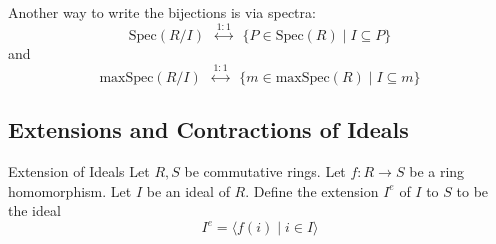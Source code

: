 \documentclass[a4paper]{article}
\begin{document}
Another way to write the bijections is via spectra: $$\text{Spec}(R/I)\;\;\overset{1:1}{\longleftrightarrow}\;\;\{P\in\text{Spec}(R)\;|\;I\subseteq P\}$$ and $$\text{maxSpec}(R/I)\;\;\overset{1:1}{\longleftrightarrow}\;\;\{m\in\text{maxSpec}(R)\;|\;I\subseteq m\}$$

\subsection{Extensions and Contractions of Ideals}
\begin{defn}{Extension of Ideals}{} Let $R,S$ be commutative rings. Let $f:R\to S$ be a ring homomorphism. Let $I$ be an ideal of $R$. Define the extension $I^e$ of $I$ to $S$ to be the ideal $$I^e=\langle f(i)\;|\;i\in I\rangle$$
\end{defn}
\end{document}
